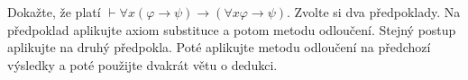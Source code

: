 Dokažte, že platí $\vdash \forall x(\varphi \rightarrow\psi) \rightarrow
(\forall x \varphi \rightarrow \psi)$. Zvolte si dva předpoklady. Na předpoklad
aplikujte axiom substituce a potom metodu odloučení. Stejný postup aplikujte na
druhý předpokla. Poté aplikujte metodu odloučení na předchozí výsledky a poté
použijte dvakrát větu o dedukci.
